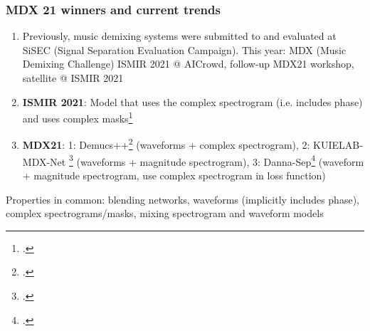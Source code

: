\documentclass[usenames,dvipsnames]{beamer}
\begin{document}
\begin{frame}
	\frametitle{MDX 21 winners and current trends}
	\begin{enumerate}
		\item
			Previously, music demixing systems were submitted to and evaluated at SiSEC (Signal Separation Evaluation Campaign). This year: MDX (Music Demixing Challenge) ISMIR 2021 @ AICrowd, follow-up MDX21 workshop, satellite @ ISMIR 2021
		\item
			\textbf{ISMIR 2021}: Model that uses the complex spectrogram (i.e. includes phase) and uses complex masks\footcite{kong2021decoupling}
		\item
			\textbf{MDX21}: 1: Demucs++\footcite{demucsplus} (waveforms + complex spectrogram), 2: KUIELAB-MDX-Net \footcite{choi2021} (waveforms + magnitude spectrogram), 3: Danna-Sep\footcite{dannasep} (waveform + magnitude spectrogram, use complex spectrogram in loss function)
	\end{enumerate}
	Properties in common: blending networks, waveforms (implicitly includes phase), complex spectrograms/masks, mixing spectrogram and waveform models
\end{frame}
\end{document}
